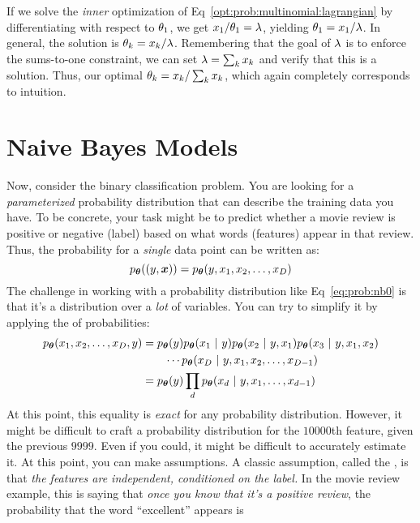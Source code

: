 If we solve the \emph{inner} optimization of
Eq~\eqref{opt:prob:multinomial:lagrangian} by differentiating with
respect to $\theta_1$, we get $x_1 / \theta_1 = \lambda$, yielding $\theta_1 = x_1
/ \lambda$.  In general, the solution is $\theta_k = x_k / \lambda$.  Remembering
that the goal of $\lambda$ is to enforce the sums-to-one constraint, we
can set $\lambda = \sum_k x_k$ and verify that this is a solution.  Thus,
our optimal $\theta_k = x_k / \sum_k x_k$, which again completely
corresponds to intuition.

\section{Naive Bayes Models}

Now, consider the binary classification problem.  You are looking for
a \emph{parameterized} probability distribution that can describe the
training data you have.  To be concrete, your task might be to predict
whether a movie review is positive or negative (label) based on what
words (features) appear in that review.  Thus, the probability for a
\emph{single} data point can be written as:
%
\begin{equation} \label{eq:prob:nb0}
  p_{\boldsymbol{\theta}}( (y, \boldsymbol{x}) )
  = p_{\boldsymbol{\theta}}( y, x_1, x_2, \dots, x_D )
\end{equation}
%
The challenge in working with a probability distribution like
Eq~\eqref{eq:prob:nb0} is that it's a distribution over a \emph{lot}
of variables.  You can try to simplify it by applying the
 of probabilities:
%
\begin{align} 
  p_{\boldsymbol{\theta}}( x_1, x_2, \dots, x_D, y )
 &= p_{\boldsymbol{\theta}}(y) p_{\boldsymbol{\theta}}(x_1 \textrm{~}\arrowvert\textrm{~} y) 
    p_{\boldsymbol{\theta}}(x_2 \textrm{~}\arrowvert\textrm{~} y, x_1) 
    p_{\boldsymbol{\theta}}(x_3 \textrm{~}\arrowvert\textrm{~} y, x_1, x_2) \nonumber\\
 &\quad\quad   \cdots 
    p_{\boldsymbol{\theta}}(x_D \textrm{~}\arrowvert\textrm{~} y, x_1, x_2, \dots, x_{D-1})
  \\
&= p_{\boldsymbol{\theta}}(y) \prod_d p_{\boldsymbol{\theta}}(x_d \textrm{~}\arrowvert\textrm{~} y, x_1, \dots, x_{d-1}) 
\label{eq:prob:nbchain} 
\end{align}
%
At this point, this equality is \emph{exact} for any probability
distribution.  However, it might be difficult to craft a probability
distribution for the $10000$th feature, given the previous $9999$.
Even if you could, it might be difficult to accurately estimate it.
At this point, you can make assumptions.  A classic assumption, called
the , is that \emph{the features are
  independent, conditioned on the label.}  In the movie review
example, this is saying that \emph{once you know that it's a positive
  review}, the probability that the word ``excellent'' appears is

